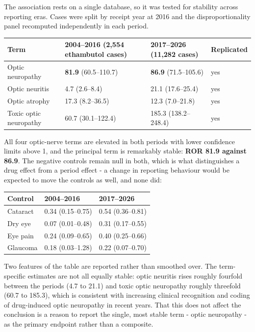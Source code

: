 \documentclass[utf8]{FrontiersinVancouver}
\begin{document}
The association rests on a single database, so it was tested for stability across reporting eras. Cases were split by receipt year at 2016 and the disproportionality panel recomputed independently in each period.

\begin{table}[htbp]
\centering
\begin{tabular}{llll}
\hline
Term & 2004--2016 (2,554 ethambutol cases) & 2017--2026 (11,282 cases) & Replicated \\
\hline
Optic neuropathy & \textbf{81.9} (60.5--110.7) & \textbf{86.9} (71.5--105.6) & yes \\
Optic neuritis & 4.7 (2.6--8.4) & 21.1 (17.6--25.4) & yes \\
Optic atrophy & 17.3 (8.2--36.5) & 12.3 (7.0--21.8) & yes \\
Toxic optic neuropathy & 60.7 (30.1--122.4) & 185.3 (138.2--248.4) & yes \\
\hline
\end{tabular}
\end{table}

All four optic-nerve terms are elevated in both periods with lower confidence limits above 1, and the principal term is remarkably stable: \textbf{ROR 81.9 against 86.9}. The negative controls remain null in both, which is what distinguishes a drug effect from a period effect - a change in reporting behaviour would be expected to move the controls as well, and none did:

\begin{table}[htbp]
\centering
\begin{tabular}{lll}
\hline
Control & 2004--2016 & 2017--2026 \\
\hline
Cataract & 0.34 (0.15--0.75) & 0.54 (0.36--0.81) \\
Dry eye & 0.07 (0.01--0.48) & 0.31 (0.17--0.55) \\
Eye pain & 0.24 (0.09--0.65) & 0.40 (0.25--0.66) \\
Glaucoma & 0.18 (0.03--1.28) & 0.22 (0.07--0.70) \\
\hline
\end{tabular}
\end{table}

Two features of the table are reported rather than smoothed over. The term-specific estimates are not all equally stable: optic neuritis rises roughly fourfold between the periods (4.7 to 21.1) and toxic optic neuropathy roughly threefold (60.7 to 185.3), which is consistent with increasing clinical recognition and coding of drug-induced optic neuropathy in recent years. That this does not affect the conclusion is a reason to report the single, most stable term - optic neuropathy - as the primary endpoint rather than a composite.
\end{document}
